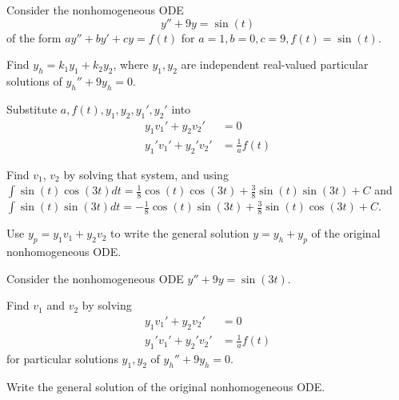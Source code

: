 \begin{applicationActivities}
\begin{activity}{20}
Consider the nonhomogeneous ODE \[y''+9y=\sin(t)\] of the
form \(ay''+by'+cy=f(t)\) for \(a=1,b=0,c=9,f(t)=\sin(t)\).
\vfill
\begin{subactivity}
Find \(y_h=k_1y_1+k_2y_2\), where \(y_1,y_2\) are
independent real-valued particular
solutions of \(y_h''+9y_h=0\).
\end{subactivity}
\begin{subactivity}
Substitute \(a,f(t),y_1,y_2,y_1',y_2'\) into
\begin{alignat*}{2}
y_1 v_1' + y_2 v_2'&=0 \\
y_1' v_1' + y_2' v_2'&=\frac{1}{a}f(t) 
\end{alignat*}
\end{subactivity}
\begin{subactivity}
Find \(v_1\), \(v_2\) by solving that system, and using
\(\int\sin(t)\cos(3t)dt=\frac{1}{8}\cos(t)\cos(3t)+\frac{3}{8}\sin(t)\sin(3t)+C\) and
\(\int\sin(t)\sin(3t)dt=-\frac{1}{8}\cos(t)\sin(3t)+\frac{3}{8}\sin(t)\cos(3t)+C\).
\end{subactivity}
\begin{subactivity}
Use \(y_p=y_1v_1+y_2v_2\) to write the general solution \(y=y_h+y_p\) 
of the original nonhomogeneous ODE.
\end{subactivity}
\end{activity}

\begin{activity}{10}
Consider the nonhomogeneous ODE \(y''+9y=\sin(3t)\).
\vfill
\begin{subactivity}
Find \(v_1\) and \(v_2\) by solving
\begin{alignat*}{2}
y_1 v_1' + y_2 v_2'&=0 \\
y_1' v_1' + y_2' v_2'&=\frac{1}{a}f(t) 
\end{alignat*}
for particular solutions \(y_1,y_2\) of \(y_h''+9y_h=0\).
\end{subactivity}
\begin{subactivity}
Write the general solution of the original nonhomogeneous ODE.
\end{subactivity}
\end{activity}

\end{applicationActivities}
